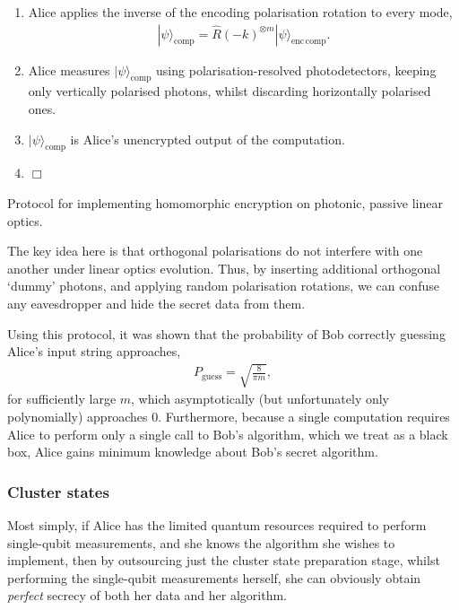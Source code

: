 \documentclass[aps,rmp,twocolumn,amsmath,amssymb,nofootinbib,superscriptaddress,longbibliography,floatfix]{revtex4-1}
\newcommand{\ket}[1]{|#1\rangle}
\newcommand{\comment}[1]{{\color{blue}{\textbf{#1}}}}
\begin{document}
\begin{table}[!htb]
{{\begin{enumerate}
    \item Alice applies the inverse of the encoding polarisation rotation to every mode,
    \begin{align}
    \ket\psi_\mathrm{comp} = \hat{R}(-k)^{\otimes m}\ket\psi_\mathrm{enc\,comp}.
    \end{align}
    \item Alice measures $\ket\psi_\mathrm{comp}$ using polarisation-resolved photodetectors, keeping only vertically polarised photons, whilst discarding horizontally polarised ones.
    \item $\ket\psi_\mathrm{comp}$ is Alice's unencrypted output of the computation.
    \item $\Box$
\end{enumerate}}}
\caption{Protocol for implementing homomorphic encryption on photonic, passive linear optics.} \label{tab:homo_LO}
\end{table}

The key idea here is that orthogonal polarisations do not interfere with one another under linear optics evolution. Thus, by inserting additional orthogonal `dummy' photons, and applying random polarisation rotations, we can confuse any eavesdropper and hide the secret data from them.

Using this protocol, it was shown that the probability of Bob correctly guessing Alice's input string approaches,
\begin{align}
P_\mathrm{guess} = \sqrt{\frac{8}{\pi m}},
\end{align}
for sufficiently large $m$, which asymptotically (but unfortunately only polynomially) approaches 0. Furthermore, because a single computation requires Alice to perform only a single call to Bob's algorithm, which we treat as a black box, Alice gains minimum knowledge about Bob's secret algorithm.

%
%

\subsubsection{Cluster states}

\comment{To do}

Most simply, if Alice has the limited quantum resources required to perform single-qubit measurements, and she knows the algorithm she wishes to implement, then by outsourcing just the cluster state preparation stage, whilst performing the single-qubit measurements herself, she can obviously obtain \emph{perfect} secrecy of both her data and her algorithm.
\end{document}
